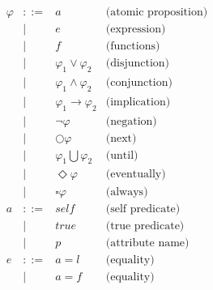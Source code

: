 \[
\begin{array}{rcll}
    \varphi     & ::=   & a                                 & \text{(atomic proposition)} \\
                & |     & e                                 & \text{(expression)} \\
                & |     & f                                 & \text{(functions)} \\
                & |     & \varphi_1 \vee \varphi_2          & \text{(disjunction)} \\
                & |     & \varphi_1 \wedge \varphi_2        & \text{(conjunction)} \\
                & |     & \varphi_1 \rightarrow \varphi_2   & \text{(implication)} \\
                & |     & \neg \varphi                      & \text{(negation)} \\
                & |     & \bigcirc \varphi                  & \text{(next)} \\
                & |     & \varphi_1 \bigcup \varphi_2       & \text{(until)} \\
                & |     & \Diamond \varphi                  & \text{(eventually)} \\
                & |     & \square \varphi                   & \text{(always)} \\
    a           & ::=   & self                              & \text{(self predicate)} \\
                & |     & true                              & \text{(true predicate)} \\
                & |     & p                                 & \text{(attribute name)} \\
    e           & ::=   & a = l                             & \text{(equality)} \\
                & |     & a = f                             & \text{(equality)} \\

\end{array}\]
